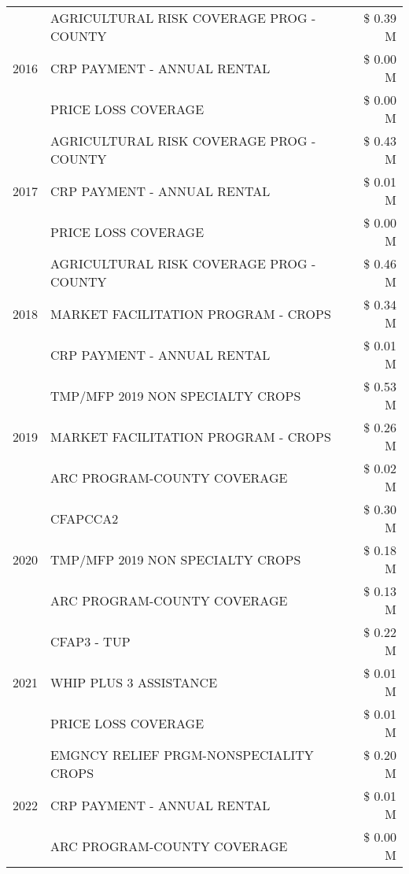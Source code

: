 \begin{tabular}{llr}
\multirow[t]{3}{*}{2016} & AGRICULTURAL RISK COVERAGE PROG - COUNTY & \$ 0.39 M \\
 & CRP PAYMENT - ANNUAL RENTAL & \$ 0.00 M \\
 & PRICE LOSS COVERAGE & \$ 0.00 M \\
\cline{1-3}
\multirow[t]{3}{*}{2017} & AGRICULTURAL RISK COVERAGE PROG - COUNTY & \$ 0.43 M \\
 & CRP PAYMENT - ANNUAL RENTAL & \$ 0.01 M \\
 & PRICE LOSS COVERAGE & \$ 0.00 M \\
\cline{1-3}
\multirow[t]{3}{*}{2018} & AGRICULTURAL RISK COVERAGE PROG - COUNTY & \$ 0.46 M \\
 & MARKET FACILITATION PROGRAM - CROPS & \$ 0.34 M \\
 & CRP PAYMENT - ANNUAL RENTAL & \$ 0.01 M \\
\cline{1-3}
\multirow[t]{3}{*}{2019} & TMP/MFP 2019 NON SPECIALTY CROPS & \$ 0.53 M \\
 & MARKET FACILITATION PROGRAM - CROPS & \$ 0.26 M \\
 & ARC PROGRAM-COUNTY COVERAGE & \$ 0.02 M \\
\cline{1-3}
\multirow[t]{3}{*}{2020} & CFAPCCA2 & \$ 0.30 M \\
 & TMP/MFP 2019 NON SPECIALTY CROPS & \$ 0.18 M \\
 & ARC PROGRAM-COUNTY COVERAGE & \$ 0.13 M \\
\cline{1-3}
\multirow[t]{3}{*}{2021} & CFAP3 - TUP & \$ 0.22 M \\
 & WHIP PLUS 3 ASSISTANCE & \$ 0.01 M \\
 & PRICE LOSS COVERAGE & \$ 0.01 M \\
\cline{1-3}
\multirow[t]{3}{*}{2022} & EMGNCY RELIEF PRGM-NONSPECIALITY CROPS & \$ 0.20 M \\
 & CRP PAYMENT - ANNUAL RENTAL & \$ 0.01 M \\
 & ARC PROGRAM-COUNTY COVERAGE & \$ 0.00 M \\
\cline{1-3}
\bottomrule
\end{tabular}
